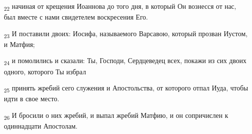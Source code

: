\begin{tcolorbox}
\textsubscript{22} начиная от крещения Иоаннова до того дня, в который Он вознесся от нас, был вместе с нами свидетелем воскресения Его.
\end{tcolorbox}
\begin{tcolorbox}
\textsubscript{23} И поставили двоих: Иосифа, называемого Варсавою, который прозван Иустом, и Матфия;
\end{tcolorbox}
\begin{tcolorbox}
\textsubscript{24} и помолились и сказали: Ты, Господи, Сердцеведец всех, покажи из сих двоих одного, которого Ты избрал
\end{tcolorbox}
\begin{tcolorbox}
\textsubscript{25} принять жребий сего служения и Апостольства, от которого отпал Иуда, чтобы идти в свое место.
\end{tcolorbox}
\begin{tcolorbox}
\textsubscript{26} И бросили о них жребий, и выпал жребий Матфию, и он сопричислен к одиннадцати Апостолам.
\end{tcolorbox}

